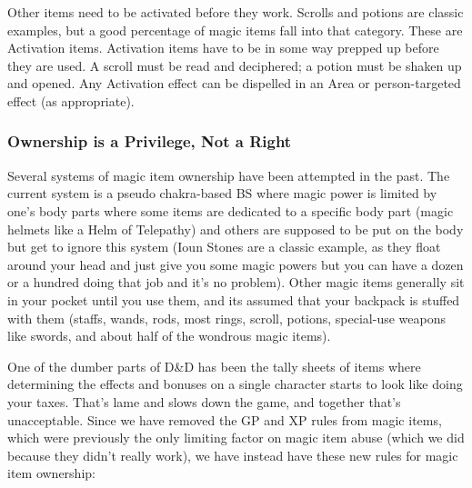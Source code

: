Other items need to be activated before they work. Scrolls and potions are classic examples, but a good percentage of magic items fall into that category. These are Activation items. Activation items have to be in some way prepped up before they are used. A scroll must be read and deciphered; a potion must be shaken up and opened. Any Activation effect can be dispelled in an Area  or person-targeted effect (as appropriate).

\subsubsection{Ownership is a Privilege, Not a Right}

Several systems of magic item ownership have been attempted in the past. The current system is a pseudo chakra-based BS where magic power is limited by one's body parts where some items are dedicated to a specific body part (magic helmets like a Helm of Telepathy) and others are supposed to be put on the body but get to ignore this system (Ioun Stones are a classic example, as they float around your head and just give you some magic powers but you can have a dozen or a hundred doing that job and it's no problem). Other magic items generally sit in your pocket until you use them, and its assumed that your backpack is stuffed with them (staffs, wands, rods, most rings, scroll, potions, special-use weapons like  swords, and about half of the wondrous magic items).

One of the dumber parts of D\&D has been the tally sheets of items where determining the effects and bonuses on a single character starts to look like doing your taxes. That's lame and slows down the game, and together that's unacceptable. Since we have removed the GP and XP rules from magic items, which were previously the only limiting factor on magic item abuse (which we did because they didn't really work), we have instead have these new rules for magic item ownership:

